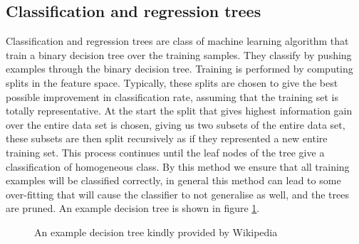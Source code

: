 \documentclass[ %
                    author={Sam Phippen},
                supervisor={Dr. Rafal Bogacz},
                     title={Real time voice activity detectors in noisy personal computing environments},
                  subtitle={},
                    degree={MEng},
                      year={2012} ]{thesis}
\begin{document}
\subsection{Classification and regression trees}

Classification and regression trees are class of machine learning algorithm
that train a binary decision tree over the training samples. They classify by
pushing examples through the binary decision tree. Training is performed by
computing splits in the feature space. Typically, these splits are chosen to
give the best possible improvement in classification rate, assuming that the
training set is totally representative. At the start the split that gives
highest information gain over the entire data set is chosen, giving us two
subsets of the entire data set, these subsets are then split recursively as if
they represented a new entire training set. This process continues until the
leaf nodes of the tree give a classification of homogeneous class. By this
method we ensure that all training examples will be classified correctly, in
general this method can lead to some over-fitting that will cause the classifier
to not generalise as well, and the trees are pruned. An example decision tree
is shown in figure \ref{fig:decision-tree}.

\begin{figure}


    \caption{An example decision tree kindly provided by Wikipedia}
    \label{fig:decision-tree}
\end{figure}
\end{document}
